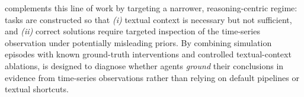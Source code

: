 \name complements this line of work by targeting a narrower, reasoning-centric regime: tasks are constructed so that \textit{(i)} textual context is necessary but not sufficient, and \textit{(ii)} correct solutions require targeted inspection of the time-series observation under potentially misleading priors.
By combining simulation episodes with known ground-truth interventions and controlled textual-context ablations, \name is designed to diagnose whether agents \emph{ground} their conclusions in evidence from time-series observations rather than relying on default pipelines or textual shortcuts.
